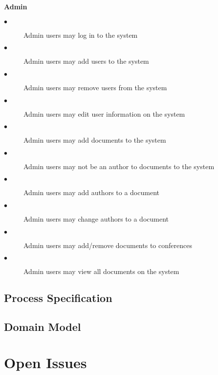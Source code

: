 \documentclass[a4paper]{article}
\begin{document}
\paragraph{\textbf{Admin}}
\begin{description}
  \item[$\bullet$] Admin users may log in to the system
    \item[$\bullet$] Admin users may add users to the system
    \item[$\bullet$] Admin users may remove users from the system
    \item[$\bullet$] Admin users may edit user information on the system
    \item[$\bullet$] Admin users may add documents to the system
    \item[$\bullet$] Admin users may not be an author to documents to the system
    \item[$\bullet$] Admin users may add authors to a document
    \item[$\bullet$] Admin users may change authors to a document
    \item[$\bullet$] Admin users may add/remove documents to conferences
    \item[$\bullet$] Admin users may view all documents on the system
\end{description}

\subsection{Process Specification}
\subsection{Domain Model}


\section{Open Issues}
\end{document}
